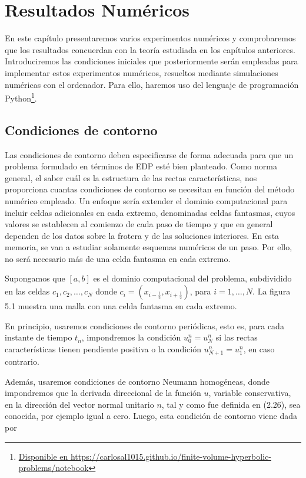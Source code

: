 \chapter{Resultados Numéricos}\label{ch:results}

En este capítulo presentaremos varios experimentos numéricos y
comprobaremos que los resultados concuerdan con la teoría estudiada
en los capítulos anteriores.
Introduciremos las condiciones iniciales que posteriormente serán
empleadas para implementar estos experimentos numéricos, resueltos
mediante simulaciones numéricas con el ordenador.
Para ello, haremos uso del lenguaje de programación
Python\footnote{\url{Disponible en https://carlosal1015.github.io/finite-volume-hyperbolic-problems/notebook}}.

\section{Condiciones de contorno}

Las condiciones de contorno deben especificarse de forma adecuada
para que un problema formulado en términos de EDP esté bien planteado.
Como norma general, el saber cuál es la estructura de las rectas
características, nos proporciona cuantas condiciones de contorno se
necesitan en función del método numérico empleado.
Un enfoque sería extender el dominio computacional para incluir
celdas adicionales en cada extremo, denominadas celdas fantasmas,
cuyos valores se establecen al comienzo de cada paso de tiempo y que
en general dependen de los datos sobre la frotera y de las soluciones
interiores.
En esta memoria, se van a estudiar solamente esquemas numéricos de un
paso.
Por ello, no será necesario más de una celda fantasma en cada extremo.

Supongamos que $\left[a,b\right]$ es el dominio computacional del
problema, subdividido en las celdas $c_{1},c_{2},\dotsc,c_{N}$ donde
$c_{i}=\left(x_{i-\frac{1}{2}},x_{i+\frac{1}{2}}\right)$, para
$i=1,\dotsc,N$.
La figura 5.1 muestra una malla con una celda fantasma en cada
extremo.

En principio, usaremos condiciones de contorno periódicas, esto es,
para cada instante de tiempo $t_{n}$, impondremos la condición
$u^{n}_{0}=u^{n}_{N}$ si las rectas características tienen pendiente
positiva o la condición $u^{n}_{N+1}=u^{n}_{1}$, en caso contrario.

Además, usaremos condiciones de contorno Neumann homogéneas, donde
impondremos que la derivada direccional de la función $u$, variable
conservativa, en la dirección del vector normal unitario $n$, tal y
como fue definida en (2.26), sea conocida, por ejemplo igual a cero.
Luego, esta condición de contorno viene dada por

